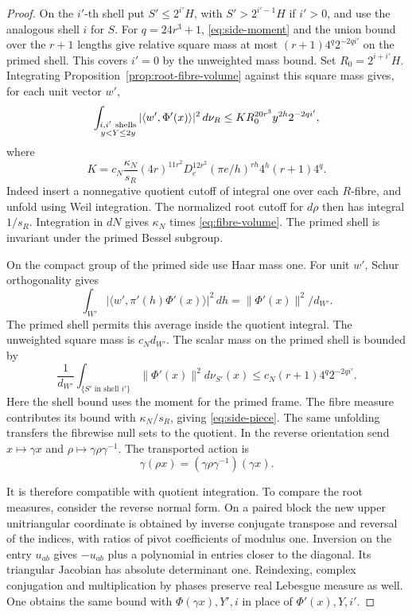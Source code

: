 \begin{proof}

On the \(i'\)-th shell put \(S'\le 2^{i'}H\), with
\(S'>2^{i'-1}H\) if \(i'>0\), and use the analogous shell
\(i\) for \(S\). For \(q=24r^3+1\),
\eqref{eq:side-moment} and the union bound over the \(r+1\)
lengths give relative square mass at most
\((r+1)4^q2^{-2qi'}\) on the primed shell. This covers
\(i'=0\) by the unweighted mass bound. Set
\(R_0=2^{i+i'}H\). Integrating Proposition~\ref{prop:root-fibre-volume} against this
square mass gives, for each unit vector \(w'\),
\begin{equation}\label{eq:side-piece}
 \int_{\substack{i,i'\ {\rm shells}\\y<Y\le2y}}
       |\langle w',\Phi'(x)\rangle|^2\,d\nu_R
 \le K R_0^{20r^3} y^{2h} 2^{-2qi'},
\end{equation}
where
\[
 K=c_N\frac{\kappa_N}{s_R}(4r)^{11r^2}D_e^{12r^2}
       (\pi e/h)^{rh}4^h(r+1)4^q.
\]
Indeed insert a nonnegative quotient cutoff of integral one
over each \(R\)-fibre, and unfold using Weil integration. The
normalized root cutoff for \(d\rho\) then has integral
\(1/s_R\). Integration in \(dN\) gives \(\kappa_N\) times
\eqref{eq:fibre-volume}. The primed shell is invariant under
the primed Bessel subgroup.

On the compact group of the primed side use Haar mass one.
For unit \(w'\), Schur orthogonality gives
\[
 \int_{W'}|\langle w',\pi'(h)\Phi'(x)\rangle|^2\,dh
       = \|\Phi'(x)\|^2/d_{W'} .
\]
The primed shell permits this average inside the quotient integral.
The unweighted square mass is \(c_Nd_{W'}\). The scalar mass
on the primed shell is bounded by
\[
   \frac{1}{d_{W'}}\int_{\{S'\text{ in shell }i'\}}
                   \|\Phi'(x)\|^2d\nu_{S'}(x)
      \le c_N(r+1)4^q2^{-2qi'}.
\]
Here the shell bound uses the moment for the primed frame. The fibre measure contributes its bound with
\(\kappa_N/s_R\), giving \eqref{eq:side-piece}.
The same unfolding transfers the fibrewise null sets to the
quotient. In the reverse orientation send \(x\mapsto\gamma x\)
and \(\rho\mapsto\gamma\rho\gamma^{-1}\).
The transported action is
\[
    \gamma(\rho x)=(\gamma\rho\gamma^{-1})(\gamma x).
\]

It is therefore compatible with quotient integration. To compare
the root measures, consider the reverse normal form.
On a paired block the new upper unitriangular coordinate is
obtained by inverse conjugate transpose and reversal of the
indices, with ratios of pivot coefficients of modulus one.
Inversion on the entry \(u_{ab}\) gives \(-u_{ab}\) plus a
polynomial in entries closer to the diagonal. Its triangular
Jacobian has absolute determinant one. Reindexing, complex
conjugation and multiplication by phases preserve real
Lebesgue measure as well. One obtains the same bound with
\(\Phi(\gamma x),Y',i\) in place of \(\Phi'(x),Y,i'\).


\end{proof}
